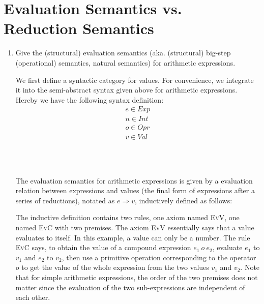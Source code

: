 \documentclass[a4paper,12pt]{article}
\newcommand{\term}[1]{\textsf{#1}}
\newcommand{\appl}[2]{#1\inparens{#2}}
\newcommand{\eval}[2]{#1 \Longrightarrow #2}
\begin{document}
\section{Evaluation Semantics vs. Reduction Semantics}

\begin{enumerate}
 \item Give the \term{(structural) evaluation semantics} (aka. \term{(structural)
  big-step (operational) semantics}, \term{natural semantics}) for arithmetic expressions.

  We first define a syntactic category for values. For convenience, we integrate it into
  the semi-abstract syntax given above for arithmetic expressions. Hereby we have the
  following syntax definition:
  \begin{gather*}
   e \in Exp \\
   n \in Int \\
   o \in Opr \\
   v \in Val
  \end{gather*}

  \begin{grammar}
   \\
   \\
  \end{grammar}
  
  The evaluation semantics for arithmetic expressions is given by a evaluation relation
  between expressions and values (the final form of expressions after a series of
  reductions), notated as $\eval{e}{v}$, inductively defined as follows:
  The inductive definition contains two rules, one axiom named \textsc{EvV}, one named
  \textsc{EvC} with two premises. The axiom \textsc{EvV} essentially says that a value
  evaluates to itself. In this example, a value can only be a number. The rule
  \textsc{EvC} says, to obtain the value of a compound expression $e_1\ o\ e_2$, evaluate
  $e_1$ to $v_1$ and $e_2$ to $v_2$, then use a primitive operation corresponding to the
  operator $o$ to get the value of the whole expression from the two values $v_1$ and $v_2$.
  Note that for simple arithmetic expressions, the order of the two premises does not
  matter since the evaluation of the two sub-expressions are independent of each other.


\end{enumerate}
\end{document}
